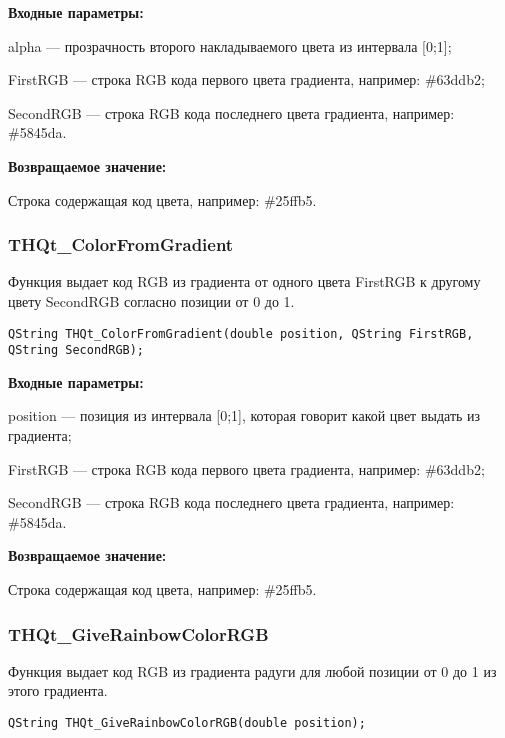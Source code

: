 \documentclass[a4paper,12pt]{article}
\begin{document}
\textbf{Входные параметры:}

alpha --- прозрачность второго накладываемого цвета из интервала [0;1];
 
    FirstRGB --- строка RGB кода первого цвета градиента, например: \#63ddb2;
 
    SecondRGB --- строка RGB кода последнего цвета градиента, например: \#5845da.

\textbf{Возвращаемое значение:}

Строка содержащая код цвета, например: \#25ffb5.


\subsubsection{THQt\_ColorFromGradient}\label{THQt_ColorFromGradient}

Функция выдает код RGB из градиента от одного цвета FirstRGB к другому цвету SecondRGB согласно позиции от 0 до 1.


\begin{lstlisting}[label=code_syntax_THQt_ColorFromGradient,caption=Синтаксис]
QString THQt_ColorFromGradient(double position, QString FirstRGB, QString SecondRGB);
\end{lstlisting}

\textbf{Входные параметры:}

position --- позиция из интервала [0;1], которая говорит какой цвет выдать из градиента;
 
    FirstRGB --- строка RGB кода первого цвета градиента, например: \#63ddb2;
 
    SecondRGB --- строка RGB кода последнего цвета градиента, например: \#5845da.

\textbf{Возвращаемое значение:}

Строка содержащая код цвета, например: \#25ffb5.


\subsubsection{THQt\_GiveRainbowColorRGB}\label{THQt_GiveRainbowColorRGB}

Функция выдает код RGB из градиента радуги для любой позиции от 0 до 1 из этого градиента.


\begin{lstlisting}[label=code_syntax_THQt_GiveRainbowColorRGB,caption=Синтаксис]
QString THQt_GiveRainbowColorRGB(double position);
\end{lstlisting}
\end{document}
